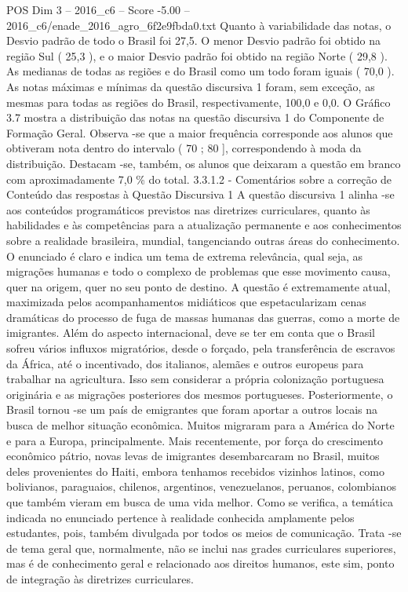 \begin{textsample}{POS Dim 3 – 2016\_c6 – Score -5.00 – 2016\_c6/enade\_2016\_agro\_6f2e9fbda0.txt}
Quanto à variabilidade das notas, o Desvio padrão de todo o Brasil foi 27,5.
O menor Desvio padrão foi obtido na região Sul ( 25,3 ), e o maior Desvio padrão foi obtido na região Norte ( 29,8 ).
As medianas de todas as regiões e do Brasil como um todo foram iguais ( 70,0 ).
As notas máximas e mínimas da questão discursiva 1 foram, sem exceção, as mesmas para todas as regiões do Brasil, respectivamente, 100,0 e 0,0.
O Gráfico 3.7 mostra a distribuição das notas na questão discursiva 1 do Componente de Formação Geral.
Observa -se que a maior frequência corresponde aos alunos que obtiveram nota dentro do intervalo ( 70 ; 80 ], correspondendo à moda da distribuição.
Destacam -se, também, os alunos que deixaram a questão em branco com aproximadamente 7,0 \% do total. 3.3.1.2 - Comentários sobre a correção de Conteúdo das respostas à Questão Discursiva 1 A questão discursiva 1 alinha -se aos conteúdos programáticos previstos nas diretrizes curriculares, quanto às habilidades e às competências para a atualização permanente e aos conhecimentos sobre a realidade brasileira, mundial, tangenciando outras áreas do conhecimento.
O enunciado é claro e indica um tema de extrema relevância, qual seja, as migrações humanas e todo o complexo de problemas que esse movimento causa, quer na origem, quer no seu ponto de destino.
A questão é extremamente atual, maximizada pelos acompanhamentos midiáticos que espetacularizam cenas dramáticas do processo de fuga de massas humanas das guerras, como a morte de imigrantes.
Além do aspecto internacional, deve se ter em conta que o Brasil sofreu vários influxos migratórios, desde o forçado, pela transferência de escravos da África, até o incentivado, dos italianos, alemães e outros europeus para trabalhar na agricultura.
Isso sem considerar a própria colonização portuguesa originária e as migrações posteriores dos mesmos portugueses.
Posteriormente, o Brasil tornou -se um país de emigrantes que foram aportar a outros locais na busca de melhor situação econômica.
Muitos migraram para a América do Norte e para a Europa, principalmente.
Mais recentemente, por força do crescimento econômico pátrio, novas levas de imigrantes desembarcaram no Brasil, muitos deles provenientes do Haiti, embora tenhamos recebidos vizinhos latinos, como bolivianos, paraguaios, chilenos, argentinos, venezuelanos, peruanos, colombianos que também vieram em busca de uma vida melhor.
Como se verifica, a temática indicada no enunciado pertence à realidade conhecida amplamente pelos estudantes, pois, também divulgada por todos os meios de comunicação.
Trata -se de tema geral que, normalmente, não se inclui nas grades curriculares superiores, mas é de conhecimento geral e relacionado aos direitos humanos, este sim, ponto de integração às diretrizes curriculares.

\end{textsample}
